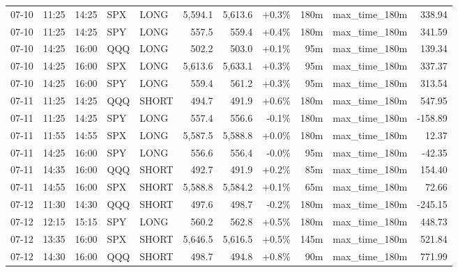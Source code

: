 \documentclass[11pt,a4paper,twoside]{article}
\begin{document}
\begin{center}
\begin{longtable}{>{\color{txtmain}}l l l l l r r r r >{\color{txtmain}}l r}
07-10 & 11:25 & 14:25 & SPX & LONG & 5,594.1 & 5,613.6 & \textcolor{wingreen}{+0.3\%} & 180m & max\_time\_180m & \textcolor{wingreen}{338.94} \\
07-10 & 11:25 & 14:25 & SPY & LONG & 557.5 & 559.4 & \textcolor{wingreen}{+0.4\%} & 180m & max\_time\_180m & \textcolor{wingreen}{341.59} \\
07-10 & 14:25 & 16:00 & QQQ & LONG & 502.2 & 503.0 & \textcolor{wingreen}{+0.1\%} & 95m & max\_time\_180m & \textcolor{wingreen}{139.34} \\
07-10 & 14:25 & 16:00 & SPX & LONG & 5,613.6 & 5,633.1 & \textcolor{wingreen}{+0.3\%} & 95m & max\_time\_180m & \textcolor{wingreen}{337.37} \\
07-10 & 14:25 & 16:00 & SPY & LONG & 559.4 & 561.2 & \textcolor{wingreen}{+0.3\%} & 95m & max\_time\_180m & \textcolor{wingreen}{313.54} \\
07-11 & 11:25 & 14:25 & QQQ & SHORT & 494.7 & 491.9 & \textcolor{wingreen}{+0.6\%} & 180m & max\_time\_180m & \textcolor{wingreen}{547.95} \\
07-11 & 11:25 & 14:25 & SPY & LONG & 557.4 & 556.6 & \textcolor{lossred}{-0.1\%} & 180m & max\_time\_180m & \textcolor{lossred}{-158.89} \\
07-11 & 11:55 & 14:55 & SPX & LONG & 5,587.5 & 5,588.8 & \textcolor{wingreen}{+0.0\%} & 180m & max\_time\_180m & \textcolor{wingreen}{12.37} \\
07-11 & 14:25 & 16:00 & SPY & LONG & 556.6 & 556.4 & \textcolor{lossred}{-0.0\%} & 95m & max\_time\_180m & \textcolor{lossred}{-42.35} \\
07-11 & 14:35 & 16:00 & QQQ & SHORT & 492.7 & 491.9 & \textcolor{wingreen}{+0.2\%} & 85m & max\_time\_180m & \textcolor{wingreen}{154.40} \\
07-11 & 14:55 & 16:00 & SPX & SHORT & 5,588.8 & 5,584.2 & \textcolor{wingreen}{+0.1\%} & 65m & max\_time\_180m & \textcolor{wingreen}{72.66} \\
07-12 & 11:30 & 14:30 & QQQ & SHORT & 497.6 & 498.7 & \textcolor{lossred}{-0.2\%} & 180m & max\_time\_180m & \textcolor{lossred}{-245.15} \\
07-12 & 12:15 & 15:15 & SPY & LONG & 560.2 & 562.8 & \textcolor{wingreen}{+0.5\%} & 180m & max\_time\_180m & \textcolor{wingreen}{448.73} \\
07-12 & 13:35 & 16:00 & SPX & SHORT & 5,646.5 & 5,616.5 & \textcolor{wingreen}{+0.5\%} & 145m & max\_time\_180m & \textcolor{wingreen}{521.84} \\
07-12 & 14:30 & 16:00 & QQQ & SHORT & 498.7 & 494.8 & \textcolor{wingreen}{+0.8\%} & 90m & max\_time\_180m & \textcolor{wingreen}{771.99} \\

\end{longtable}
\end{center}
\end{document}
